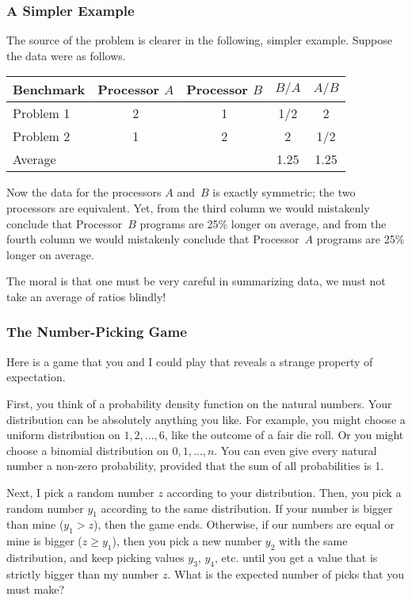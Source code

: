 \begin{editingnotes}
\subsubsection{A Simpler Example}

The source of the problem is clearer in the following, simpler
example.  Suppose the data were as follows.
\begin{center}
\begin{tabular}{lcccc}
Benchmark   & Processor $A$ & Processor $B$ & $B / A$   & $A / B$  \\
\hline
Problem 1   & 2             & 1             & 1/2       & 2 \\
Problem 2   & 1             & 2             & 2         & 1/2 \\
\hline
Average     &               &               & 1.25      & 1.25
\end{tabular}
\end{center}

Now the data for the processors $A$ and~$B$ is exactly symmetric; the
two processors are equivalent.  Yet, from the third column we would
mistakenly conclude that Processor~$B$ programs are 25\% longer on
average, and from the fourth column we would mistakenly conclude that
Processor~$A$ programs are 25\% longer on average.

The moral is that one must be very careful in summarizing data, we must
not take an average of ratios blindly!


\subsubsection{The Number-Picking Game}

Here is a game that you and I could play that reveals a strange
property of expectation.

First, you think of a probability density function on the natural
numbers.  Your distribution can be absolutely anything you like.  For
example, you might choose a uniform distribution on $1, 2, \dots, 6$,
like the outcome of a fair die roll.  Or you might choose a binomial
distribution on $0, 1, \dots, n$.  You can even give every natural
number a non-zero probability, provided that the sum of all
probabilities is 1.

Next, I pick a random number $z$ according to your distribution.
Then, you pick a random number $y_1$ according to the same
distribution.  If your number is bigger than mine ($y_1 > z$), then
the game ends.  Otherwise, if our numbers are equal or mine is bigger
($z \geq y_1$), then you pick a new number $y_2$ with the same
distribution, and keep picking values $y_3$, $y_4$, etc. until you get
a value that is strictly bigger than my number $z$.  What is the
expected number of picks that you must make?


\end{editingnotes}
